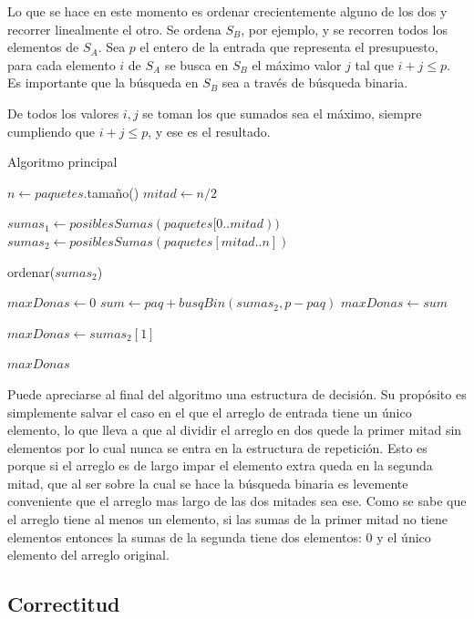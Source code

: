 Lo que se hace en este momento es ordenar crecientemente alguno de los dos y
recorrer linealmente el otro. Se ordena $S_B$, por ejemplo, y se recorren todos
los elementos de $S_A$. Sea $p$ el entero de la entrada que representa el
presupuesto, para cada elemento $i$ de $S_A$ se busca en $S_B$ el máximo valor
$j$ tal que $i + j \leq p$. Es importante que la búsqueda en $S_B$ sea a través
de búsqueda binaria.

De todos los valores $i,j$ se toman los que sumados sea el máximo, siempre
cumpliendo que $i + j \leq p$, y ese es el resultado.

\bigskip

\begin{algorithm}[H]
	\caption{Algoritmo principal}
    $n \gets paquetes$.tamaño() \;
	$mitad \gets n / 2$ \;

	$sumas_1 \gets posiblesSumas(paquetes[0..mitad))$ \;
	$sumas_2 \gets posiblesSumas(paquetes[mitad..n])$ \;

	ordenar($sumas_2$) \;

	$maxDonas \gets 0$ \;
	 {
		 {
			$sum \gets paq + busqBin(sumas_2, p - paq)$ \;
			 {
				$maxDonas \gets sum$ \;
			}
		}
	}

	 {
		$maxDonas \gets sumas_2[1]$ \;
	}

	\Return $maxDonas$ \;
\end{algorithm}

Puede apreciarse al final del algoritmo una estructura de decisión. Su propósito
es simplemente salvar el caso en el que el arreglo de entrada tiene un único
elemento, lo que lleva a que al dividir el arreglo en dos quede la primer mitad
sin elementos por lo cual nunca se entra en la estructura de repetición. Esto es
porque si el arreglo es de largo impar el elemento extra queda en la segunda
mitad, que al ser sobre la cual se hace la búsqueda binaria es levemente
conveniente que el arreglo mas largo de las dos mitades sea ese. Como se sabe
que el arreglo tiene al menos un elemento, si las sumas de la primer mitad no
tiene elementos entonces la sumas de la segunda tiene dos elementos: 0 y el
único elemento del arreglo original.

\subsection{Correctitud}


